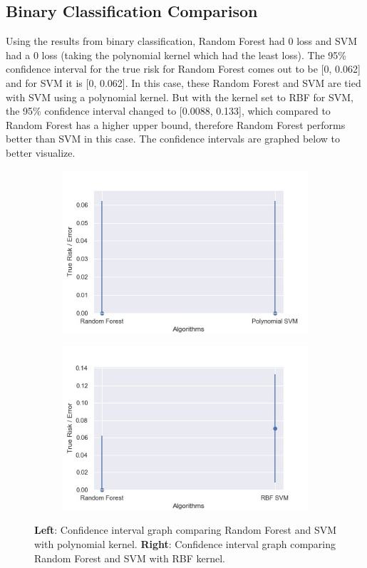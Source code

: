 \documentclass[11pt,a4paper,titlepage]{article}
\begin{document}
	\subsection{Binary Classification Comparison}
	Using the results from binary classification, Random Forest had 0 loss and SVM had a 0 loss (taking the polynomial kernel which had the least loss). The 95\% confidence interval for the true risk for Random Forest comes out to be [0, 0.062] and for SVM it is [0, 0.062]. In this case, these Random Forest and SVM are tied with SVM using a polynomial kernel. But with the kernel set to RBF for SVM, the 95\%  confidence interval changed to [0.0088, 0.133], which compared to Random Forest has a higher upper bound, therefore Random Forest performs better than SVM in this case. The confidence intervals are graphed below to better visualize.
	\begin{figure}[H]
		\centering
		\begin{subfigure}{0.4\textwidth}
			\includegraphics[scale=0.4]{img/binary_errorgraph1.jpg}
		\end{subfigure}
		\begin{subfigure}{0.4\textwidth}
			\includegraphics[scale=0.4]{img/binary_errorgraph2.jpg}
		\end{subfigure}
		\caption{\textbf{Left}: Confidence interval graph comparing Random Forest and SVM with polynomial kernel. \textbf{Right}: Confidence interval graph comparing Random Forest and SVM with RBF kernel.}
	\end{figure}
\end{document}
